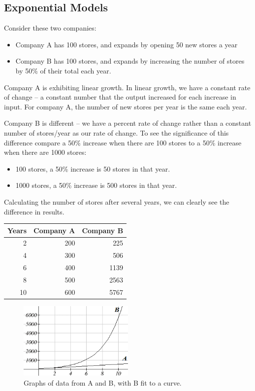 \subsection{Exponential Models}
\label{ssec:models-exp}

Consider these two companies:
\begin{itemize}
  \item Company A has 100 stores, and expands by opening 50 new stores a year
  \item Company B has 100 stores, and expands by increasing the number of stores by 50\% of their total each year.
\end{itemize}
Company A is exhibiting linear growth. In linear growth, we have a constant rate of change -- a constant number that the output increased for each increase in input. For company A, the number of new stores per year is the same each year.

Company B is different -- we have a percent rate of change rather than a constant number of stores/year as our rate of change. To see the significance of this difference compare a 50\% increase when there are 100 stores to a 50\% increase when there are 1000 stores:
\begin{itemize}
  \item 100 stores, a 50\% increase is 50 stores in that year.
  \item 1000 stores, a 50\% increase is 500 stores in that year.
\end{itemize}
Calculating the number of stores after several years, we can clearly see the difference in results.

\begin{table}[!ht]
  \centering
  \begin{tabular}{rrr}
    \toprule
    Years	& Company A	& Company B	\\
    \midrule
    2	 & 200 & 	225	\\
    4	& 300	& 506	\\
    6	& 400	& 1139	\\
    8	& 500 &	2563	\\
    10&	600 & 	5767\\
    \bottomrule
  \end{tabular}
\end{table}

\begin{figure}[!ht]
\centering
\includegraphics[width=0.5\textwidth]{img/chap1/sec1-6/image072.png}
\caption{Graphs of data from A and B, with B fit to a curve.}
\end{figure}

